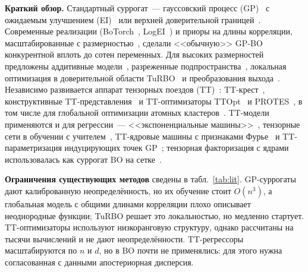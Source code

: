\documentclass[11pt,a4paper]{article}
\begin{document}
\textbf{Краткий обзор.} Стандартный суррогат~--- гауссовский процесс (GP)~\cite{rasmussen2006gpml}
с ожидаемым улучшением (EI)~\cite{jones1998ego} или верхней доверительной границей~\cite{srinivas2012gpucb}.
Современные реализации (BoTorch~\cite{balandat2020botorch}, LogEI~\cite{ament2023logei}) и приоры на длины
корреляции, масштабированные с размерностью~\cite{hvarfner2024vanilla}, сделали <<обычную>> GP-BO
конкурентной вплоть до сотен переменных. Для высоких размерностей предложены аддитивные
модели~\cite{duvenaud2011additive,kandasamy2015additive}, разреженные подпространства~\cite{eriksson2021saasbo},
локальная оптимизация в доверительной области TuRBO~\cite{eriksson2019turbo} и преобразования
выхода~\cite{cowenrivers2022hebo}. Независимо развивается аппарат тензорных поездов
(TT)~\cite{oseledets2011tt,cichocki2016part1,cichocki2017part2}: TT-крест~\cite{oseledets2010ttcross},
конструктивные TT-представления~\cite{ryzhakov2023constructive} и TT-оптимизаторы
TTOpt~\cite{sozykin2022ttopt} и PROTES~\cite{batsheva2023protes}, в том числе для глобальной оптимизации
атомных кластеров~\cite{sozykin2026clusters}. TT-модели применяются и для регрессии~---
<<экспоненциальные машины>>~\cite{novikov2016expmachines}, тензорные сети в
обучении с учителем~\cite{stoudenmire2016supervised}, TT-ядровые машины с признаками
Фурье~\cite{wesel2021fourier,wesel2025tnkm} и TT-параметризация индуцирующих точек
GP~\cite{izmailov2018ttgp}; тензорная факторизация с ядрами использовалась как суррогат BO на
сетке~\cite{lei2023bktf}.

\textbf{Ограничения существующих методов} сведены в табл.~\ref{tab:lit}. GP-суррогаты дают
калиброванную неопределённость, но их обучение стоит $O(n^3)$, а глобальная модель с общими длинами
корреляции плохо описывает неоднородные функции; TuRBO решает это локальностью, но медленно стартует.
TT-оптимизаторы используют низкоранговую структуру, однако рассчитаны на тысячи вычислений и не дают
неопределённости. TT-регрессоры масштабируются по $n$ и $d$, но в BO почти не применялись: для этого нужна
согласованная с данными апостериорная дисперсия.
\end{document}
